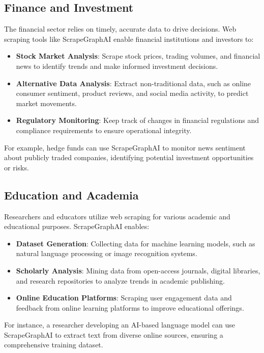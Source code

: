 \subsection{Finance and Investment}
The financial sector relies on timely, accurate data to drive decisions. Web scraping tools like ScrapeGraphAI enable financial institutions and investors to:
\begin{itemize}
    \item \textbf{Stock Market Analysis}: Scrape stock prices, trading volumes, and financial news to identify trends and make informed investment decisions.
    \item \textbf{Alternative Data Analysis}: Extract non-traditional data, such as online consumer sentiment, product reviews, and social media activity, to predict market movements.
    \item \textbf{Regulatory Monitoring}: Keep track of changes in financial regulations and compliance requirements to ensure operational integrity.
\end{itemize}
For example, hedge funds can use ScrapeGraphAI to monitor news sentiment about publicly traded companies, identifying potential investment opportunities or risks.

\subsection{Education and Academia}
Researchers and educators utilize web scraping for various academic and educational purposes. ScrapeGraphAI enables:
\begin{itemize}
    \item \textbf{Dataset Generation}: Collecting data for machine learning models, such as natural language processing or image recognition systems.
    \item \textbf{Scholarly Analysis}: Mining data from open-access journals, digital libraries, and research repositories to analyze trends in academic publishing.
    \item \textbf{Online Education Platforms}: Scraping user engagement data and feedback from online learning platforms to improve educational offerings.
\end{itemize}
For instance, a researcher developing an AI-based language model can use ScrapeGraphAI to extract text from diverse online sources, ensuring a comprehensive training dataset.

